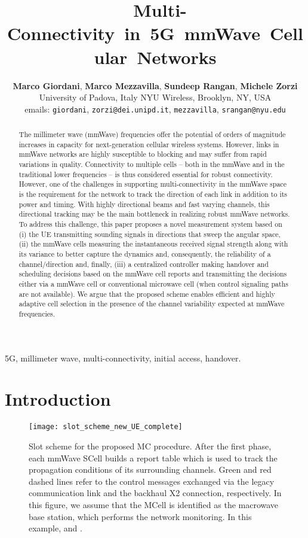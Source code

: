 \documentclass[conference,a4paper]{IEEEtran}
\title{\mbox{ \hspace{-0.3899 cm}Multi-Connectivity \hspace{-0.4 cm} in  \hspace{-0.4 cm} 5G  \hspace{-0.4 cm} mmWave  \hspace{-0.4 cm} Cellular  \hspace{-0.4 cm} Networks}}
\author{{{\bf Marco Giordani}, {\bf Marco Mezzavilla}, {\bf Sundeep Rangan}, {\bf Michele Zorzi} }\\
 University of Padova, Italy \quad NYU Wireless, Brooklyn, NY, USA \\
emails: \small{\texttt{giordani}, \texttt{zorzi}\texttt{@dei.unipd.it}, \texttt{mezzavilla}, \texttt{srangan}\texttt{@nyu.edu}
}}
\begin{document}
\maketitle

\begin{abstract}  The millimeter wave (mmWave) frequencies offer the potential of orders of magnitude
increases in capacity for next-generation cellular wireless systems.  However, links in mmWave networks are highly
susceptible to blocking and may suffer from rapid variations in quality.
Connectivity to multiple cells -- both in the mmWave and  in the traditional lower frequencies -- is thus considered
essential for robust connectivity. However, one of the challenges in supporting multi-connectivity in the mmWave
space is the requirement for the network  to track the direction of each link in addition to its
power and timing.  With highly directional beams and fast varying channels, this directional tracking
may be the main bottleneck in realizing robust mmWave networks.
To address this challenge, this paper
proposes a novel measurement system based on (i) the UE transmitting sounding signals in
directions that sweep the angular space, (ii) the
mmWave cells measuring the instantaneous received signal strength along with its variance to better capture the dynamics and, consequently, the reliability of a channel/direction and, finally, 
(iii) a centralized controller making handover and scheduling decisions based on the mmWave cell
reports and  transmitting the decisions either via a mmWave cell or conventional microwave cell (when control signaling paths are not available).  
We argue that the proposed scheme enables efficient and highly adaptive 
cell selection in the presence of the channel variability  expected at mmWave frequencies.
\end{abstract}

\begin{IEEEkeywords}
5G, millimeter wave, multi-connectivity, initial access, handover.
\end{IEEEkeywords}

\section{Introduction}

\begin{figure*}[t!]
\centering
 \texttt{[image: slot\_scheme\_new\_UE\_complete]}
 \caption{Slot scheme for the proposed MC procedure. After the first phase, each mmWave SCell builds a report table which is used to track the propagation conditions of its surrounding channels. Green and red dashed lines refer to the control messages exchanged  via the legacy communication link and the backhaul X2  connection, respectively. In this figure, we assume that the MCell is identified as the macrowave base station, which performs the network monitoring. In this example,  and .}
 \label{fig:slot_scheme}
\end{figure*}
\end{document}

